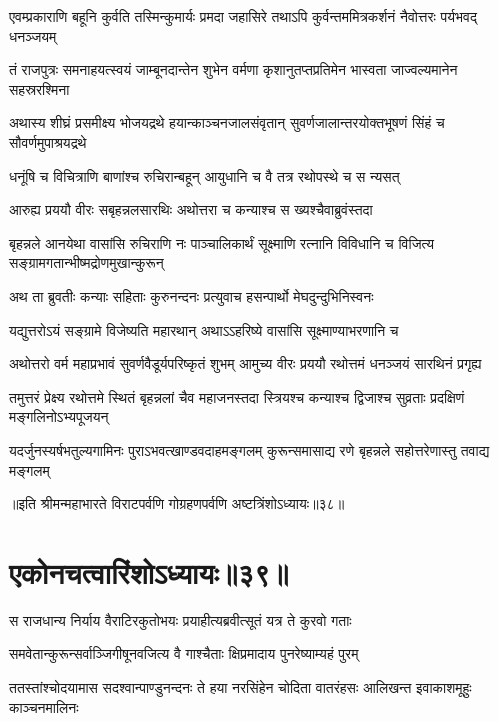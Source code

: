 \twolineshloka
{एवम्प्रकाराणि बहूनि कुर्वति तस्मिन्कुमार्यः प्रमदा जहासिरे}
{तथाऽपि कुर्वन्तममित्रकर्शनं नैवोत्तरः पर्यभवद् धनञ्जयम्}


\twolineshloka
{तं राजपुत्रः समनाहयत्स्वयं जाम्बूनदान्तेन शुभेन वर्मणा}
{कृशानुतप्तप्रतिमेन भास्वता जाज्वल्यमानेन सहस्ररश्मिना}


\twolineshloka
{अथास्य शीघ्रं प्रसमीक्ष्य भोजयद्रथे हयान्काञ्चनजालसंवृतान्}
{सुवर्णजालान्तरयोक्तभूषणं सिंहं च सौवर्णमुपाश्रयद्रथे}


\twolineshloka
{धनूंषि च विचित्राणि बाणांश्च रुचिरान्बहून्}
{आयुधानि च वै तत्र रथोपस्थे च स न्यसत्}


\twolineshloka
{आरुह्य प्रययौ वीरः सबृहन्नलसारथिः}
{अथोत्तरा च कन्याश्च स ख्यश्चैवाब्रुवंस्तदा}


\threelineshloka
{बृहन्नले आनयेथा वासांसि रुचिराणि नः}
{पाञ्चालिकार्थं सूक्ष्माणि रत्नानि विविधानि च}
{विजित्य सङ्ग्रामगतान्भीष्मद्रोणमुखान्कुरून्}


\twolineshloka
{अथ ता ब्रुवतीः कन्याः सहिताः कुरुनन्दनः}
{प्रत्युवाच हसन्पार्थो मेघदुन्दुभिनिस्वनः}


\twolineshloka
{यद्युत्तरोऽयं सङ्ग्रामे विजेष्यति महारथान्}
{अथाऽऽहरिष्ये वासांसि सूक्ष्माण्याभरणानि च}



\twolineshloka
{अथोत्तरो वर्म महाप्रभावं सुवर्णवैडूर्यपरिष्कृतं शुभम्}
{आमुच्य वीरः प्रययौ रथोत्तमं धनञ्जयं सारथिनं प्रगृह्य}


\twolineshloka
{तमुत्तरं प्रेक्ष्य रथोत्तमे स्थितं बृहन्नलां चैव महाजनस्तदा}
{स्त्रियश्च कन्याश्च द्विजाश्च सुव्रताः प्रदक्षिणं मङ्गलिनोऽभ्यपूजयन्}


\twolineshloka
{यदर्जुनस्यर्षभतुल्यगामिनः पुराऽभवत्खाण्डवदाहमङ्गलम्}
{कुरून्समासाद्य रणे बृहन्नले सहोत्तरेणास्तु तवाद्य मङ्गलम्}

॥इति श्रीमन्महाभारते विराटपर्वणि गोग्रहणपर्वणि अष्टत्रिंशोऽध्यायः॥३८॥

\chapter{एकोनचत्वारिंशोऽध्यायः॥३९॥}

\twolineshloka
{स राजधान्य निर्याय वैराटिरकुतोभयः}
{प्रयाहीत्यब्रवीत्सूतं यत्र ते कुरवो गताः}


\twolineshloka
{समवेतान्कुरून्सर्वाञ्जिगीषूनवजित्य वै}
{गाश्चैताः क्षिप्रमादाय पुनरेष्याम्यहं पुरम्}


\onelineshloka
{ततस्तांश्चोदयामास सदश्वान्पाण्डुनन्दनः}
\twolineshloka
{ते हया नरसिंहेन चोदिता वातरंहसः}
{आलिखन्त इवाकाशमूहुः काञ्चनमालिनः}


